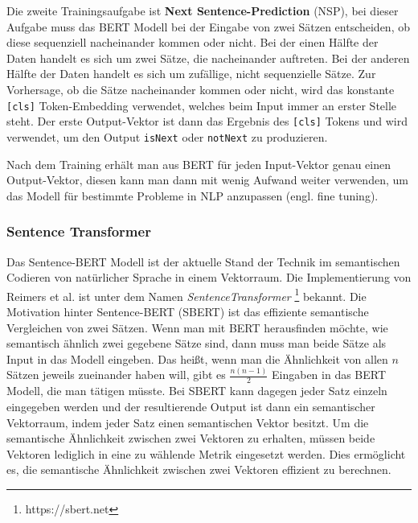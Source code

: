 \documentclass[12pt,letterpaper,ngerman]{article}
\begin{document}
Die zweite Trainingsaufgabe ist {\bf Next Sentence-Prediction} (NSP),
bei dieser Aufgabe muss das BERT Modell bei der Eingabe von zwei Sätzen 
entscheiden, ob diese sequenziell nacheinander kommen oder nicht.
Bei der einen Hälfte der Daten handelt es sich um zwei Sätze, die nacheinander 
auftreten. Bei der anderen Hälfte der Daten handelt es sich um zufällige,
nicht sequenzielle Sätze. Zur Vorhersage, ob die Sätze nacheinander kommen 
oder nicht, wird das konstante \verb|[cls]| Token-Embedding verwendet, 
welches beim Input immer an erster Stelle steht. Der erste Output-Vektor 
ist dann das Ergebnis des \verb|[cls]| Tokens und wird verwendet, um den Output
\verb|isNext| oder \verb|notNext| zu produzieren.

Nach dem Training erhält man aus BERT für jeden Input-Vektor genau einen 
Output-Vektor, diesen kann man dann mit wenig Aufwand weiter verwenden,
um das Modell für bestimmte Probleme in NLP anzupassen 
(engl. fine tuning).

\subsubsection{Sentence Transformer}
Das Sentence-BERT \cite{reimers-2019-sentence-bert}
Modell ist der aktuelle Stand der Technik im semantischen Codieren von 
natürlicher Sprache in einem Vektorraum. Die Implementierung von 
Reimers et al.
ist unter dem Namen \textit{SentenceTransformer} 
\footnote{https://sbert.net}
bekannt. Die Motivation 
hinter Sentence-BERT (SBERT) ist das effiziente semantische Vergleichen 
von zwei Sätzen. Wenn man mit BERT herausfinden möchte, wie semantisch
ähnlich zwei gegebene Sätze sind, dann muss man beide Sätze als Input 
in das Modell eingeben. Das heißt, wenn man die Ähnlichkeit von allen
$n$ Sätzen jeweils zueinander haben will, gibt es $\frac{n(n-1)}{2}$ 
Eingaben in das BERT Modell, die man tätigen müsste.
Bei SBERT kann dagegen jeder Satz einzeln eingegeben werden und der
resultierende Output ist dann ein semantischer Vektorraum, indem jeder 
Satz einen semantischen Vektor besitzt. Um die semantische Ähnlichkeit 
zwischen zwei Vektoren zu erhalten, müssen beide Vektoren lediglich in 
eine zu wählende Metrik eingesetzt werden. 
Dies ermöglicht es, die semantische Ähnlichkeit zwischen zwei Vektoren 
effizient zu berechnen.
\end{document}
